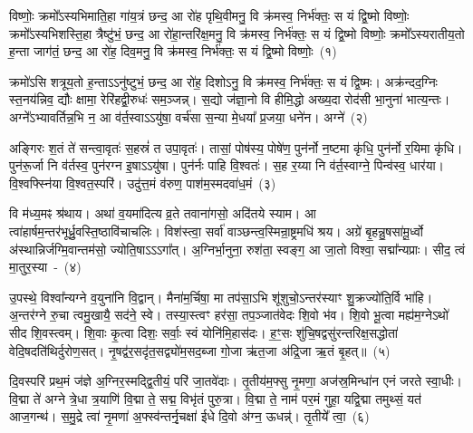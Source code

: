 \setcounter{anuvakam}{0}
विष्णोः॒ क्रमो᳚\-ऽस्यभिमाति॒हा गा॑य॒त्रं छन्द॒ आ रो॑ह पृथि॒वीमनु॒ वि क्र॑मस्व॒ निर्भ॑क्तः॒ स यं द्वि॒ष्मो विष्णोः॒ क्रमो᳚\-ऽस्यभिशस्ति॒हा त्रैष्टु॑भं॒ छन्द॒ आ रो॑हा॒न्तरि॑क्ष॒मनु॒ वि क्र॑मस्व॒ निर्भ॑क्तः॒ स यं द्वि॒ष्मो विष्णोः॒ क्रमो᳚\-ऽस्यरातीय॒तो ह॒न्ता जाग॑तं॒ छन्द॒ आ रो॑ह॒ दिव॒मनु॒ वि क्र॑मस्व॒ निर्भ॑क्तः॒ स यं द्वि॒ष्मो विष्णोः॒~(१)\ip

क्रमो॑\-ऽसि शत्रूय॒तो ह॒न्ताऽऽनु॑ष्टुभं॒ छन्द॒ आ रो॑ह॒ दिशो\-ऽनु॒ वि क्र॑मस्व॒ निर्भ॑क्तः॒ स यं द्वि॒ष्मः। अक्र॑न्दद॒ग्निः स्त॒नय॑न्निव॒ द्यौः क्षामा॒ रेरि॑हद्वी॒रुधः॑ सम॒ञ्जन्न्। स॒द्यो ज॑ज्ञा॒नो वि हीमि॒द्धो अख्य॒दा रोद॑सी भा॒नुना॑ भात्य॒न्तः। अग्ने᳚\-ऽभ्यावर्तिन्न॒भि न॒ आ व॑र्त॒स्वाऽऽयु॑षा॒ वर्च॑सा स॒न्या मे॒धया᳚ प्र॒जया॒ धने॑न। अग्ने॑~(२)\ip

अङ्गिरः श॒तं ते॑ सन्त्वा॒वृतः॑ स॒हस्रं॑ त उपा॒वृतः॑। तासां॒ पोष॑स्य॒ पोषे॑ण॒ पुन॑र्नो न॒ष्टमा कृ॑धि॒ पुन॑र्नो र॒यिमा कृ॑धि। पुन॑रू॒र्जा नि व॑र्तस्व॒ पुन॑रग्न इ॒षा\-ऽऽ\-यु॑षा। पुन॑र्नः पाहि वि॒श्वतः॑। स॒ह र॒य्या नि व॑र्त॒स्वाग्ने॒ पिन्व॑स्व॒ धार॑या। वि॒श्वफ्स्नि॑या वि॒श्वत॒स्परि॑। उदु॑त्त॒मं व॑रुण॒ पाश॑म॒स्मदवा॑ध॒मं~(३)\ip

वि म॑ध्य॒मꣴ श्र॑थाय। अथा॑ व॒यमा॑दित्य व्र॒ते तवाना॑गसो॒ अदि॑तये स्याम। आ त्वा॑हार्\mbox{}षम॒न्तर॑भूर्ध्रु॒वस्ति॒ष्ठा\-वि॑चाचलिः। विश॑स्त्वा॒ सर्वा॑ वाञ्छन्त्व॒स्मिन्रा॒ष्ट्रमधि॑ श्रय। अग्रे॑ बृ॒हन्नु॒षसा॑मू॒र्ध्वो अ॑स्थान्निर्जग्मि॒वान्तम॑सो॒ ज्योति॒षा\-ऽऽ\-ऽ\-गा᳚त्। अ॒ग्निर्भा॒नुना॒ रुश॑ता॒ स्वङ्ग॒ आ जा॒तो विश्वा॒ सद्मा᳚न्यप्राः। सीद॒ त्वं मा॒तुर॒स्या~-~(४)\ip

उ॒पस्थे॒ विश्वा᳚न्यग्ने व॒युना॑नि वि॒द्वान्। मैना॑म॒र्चिषा॒ मा तप॑सा॒\-ऽभि शू॑शुचो॒\-ऽन्तर॑स्याꣳ शु॒क्रज्यो॑ति॒र्वि भा॑हि। अ॒न्तर॑ग्ने रु॒चा त्वमु॒खायै॒ सद॑ने॒ स्वे। तस्या॒स्त्वꣳ हर॑सा॒ तप॒ञ्जात॑वेदः शि॒वो भ॑व। शि॒वो भू॒त्वा मह्य॑म॒ग्ने\-ऽथो॑ सीद शि॒वस्त्वम्। शि॒वाः कृ॒त्वा दिशः॒ सर्वाः॒ स्वं योनि॑मि॒हास॑दः। ह॒ꣳ॒सः शु॑चि॒षद्वसु॑रन्तरिक्ष॒सद्धोता॑ वेदि॒षदति॑थिर्दुरोण॒सत्। नृ॒षद्व॑र॒सदृ॑त॒सद्व्यो॑म॒सद॒ब्जा गो॒जा ऋ॑त॒जा अ॑द्रि॒जा ऋ॒तं बृ॒हत्॥~(५)\ip

{\anuvakamend[{दिव॒मनु॒ वि क्र॑मस्व॒ निर्भ॑क्तः॒ स यं द्वि॒ष्मो विष्णो॒र्धने॒नाग्ने॑\-ऽध॒मम॒स्याः शु॑चि॒षथ्षोड॑श च}]}

दि॒वस्परि॑ प्रथ॒मं ज॑ज्ञे अ॒ग्निर॒स्मद्द्वि॒तीयं॒ परि॑ जा॒तवे॑दाः। तृ॒तीय॑म॒फ्सु नृ॒मणा॒ अज॑स्र॒मिन्धा॑न एनं जरते स्वा॒धीः। वि॒द्मा ते॑ अग्ने त्रे॒धा त्र॒याणि॑ वि॒द्मा ते॒ सद्म॒ विभृ॑तं पुरु॒त्रा। वि॒द्मा ते॒ नाम॑ पर॒मं गुहा॒ यद्वि॒द्मा तमुथ्सं॒ यत॑ आज॒गन्थ॑। स॒मु॒द्रे त्वा॑ नृ॒मणा॑ अ॒फ्स्व॑न्तर्नृ॒चक्षा॑ ईधे दि॒वो अ॑ग्न॒ ऊधन्न्॑। तृ॒तीये᳚ त्वा॒~(६)\ip

